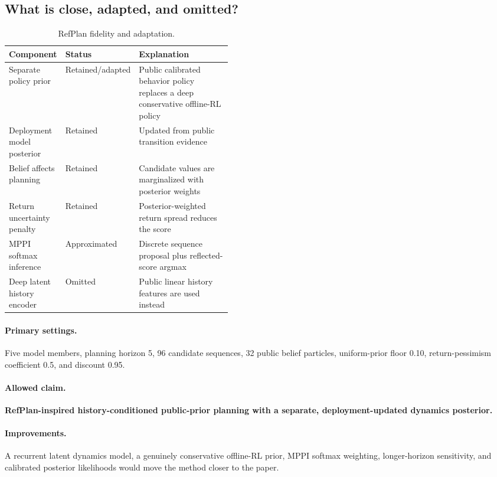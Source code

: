 \documentclass[11pt,a4paper]{article}
\newcommand{\adaptation}[1]{\textcolor{adaptgreen}{\textbf{#1}}}
\begin{document}
\subsection{What is close, adapted, and omitted?}

\begin{table}[ht]
\centering
\caption{RefPlan fidelity and adaptation.}
\begin{tabularx}{\linewidth}{P{0.25\linewidth}P{0.19\linewidth}Y}
\toprule
Component & Status & Explanation \\
\midrule
Separate policy prior & Retained/adapted & Public calibrated behavior policy replaces a deep conservative offline-RL policy \\
Deployment model posterior & Retained & Updated from public transition evidence \\
Belief affects planning & Retained & Candidate values are marginalized with posterior weights \\
Return uncertainty penalty & Retained & Posterior-weighted return spread reduces the score \\
MPPI softmax inference & Approximated & Discrete sequence proposal plus reflected-score argmax \\
Deep latent history encoder & Omitted & Public linear history features are used instead \\
\bottomrule
\end{tabularx}
\end{table}

\paragraph{Primary settings.}
Five model members, planning horizon 5, 96 candidate sequences, 32 public belief particles,
uniform-prior floor 0.10, return-pessimism coefficient 0.5, and discount 0.95.

\paragraph{Allowed claim.}
\adaptation{RefPlan-inspired history-conditioned public-prior planning with a separate,
deployment-updated dynamics posterior.}

\paragraph{Improvements.}
A recurrent latent dynamics model, a genuinely conservative offline-RL prior, MPPI softmax
weighting, longer-horizon sensitivity, and calibrated posterior likelihoods would move the method
closer to the paper.
\end{document}
